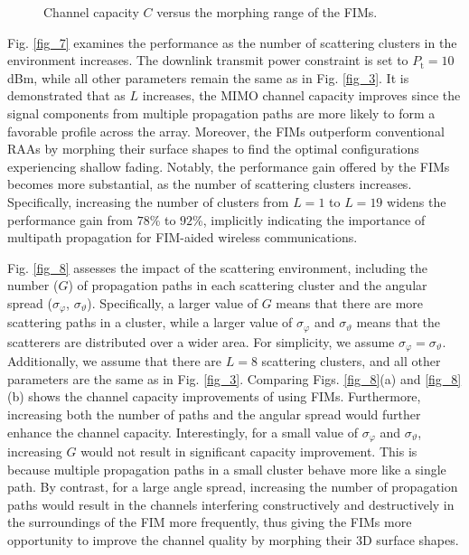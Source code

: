 \documentclass[lettersize,journal]{IEEEtran}
\begin{document}
\begin{figure}[!t]
\centering
{}
\caption{Channel capacity $C$ versus the morphing range of the FIMs.}\vspace{-0.5cm}
\label{fig_9}
\end{figure}

Fig. \ref{fig_7} examines the performance as the number of scattering clusters in the environment increases. The downlink transmit power constraint is set to $P_\textrm{t} = 10$ dBm, while all other parameters remain the same as in Fig. \ref{fig_3}. It is demonstrated that as $L$ increases, the MIMO channel capacity improves since the signal components from multiple propagation paths are more likely to form a favorable profile across the array. Moreover, the FIMs outperform conventional RAAs by morphing their surface shapes to find the optimal configurations experiencing shallow fading. Notably, the performance gain offered by the FIMs becomes more substantial, as the number of scattering clusters increases. Specifically, increasing the number of clusters from $L = 1$ to $L = 19$ widens the performance gain from $78$\% to $92$\%, implicitly indicating the importance of multipath propagation for FIM-aided wireless communications.

Fig. \ref{fig_8} assesses the impact of the scattering environment, including the number ($G$) of propagation paths in each scattering cluster and the angular spread (${\sigma}_{\varphi}$, ${\sigma}_{\vartheta}$). Specifically, a larger value of $G$ means that there are more scattering paths in a cluster, while a larger value of ${\sigma}_{\varphi}$ and ${\sigma}_{\vartheta}$ means that the scatterers are distributed over a wider area. For simplicity, we assume ${\sigma}_{\varphi} = {\sigma}_{\vartheta}$. Additionally, we assume that there are $L = 8$ scattering clusters, and all other parameters are the same as in Fig. \ref{fig_3}. Comparing Figs. \ref{fig_8}(a) and \ref{fig_8}(b) shows the channel capacity improvements of using FIMs. Furthermore, increasing both the number of paths and the angular spread would further enhance the channel capacity. Interestingly, for a small value of ${\sigma}_{\varphi}$ and ${\sigma}_{\vartheta}$, increasing $G$ would not result in significant capacity improvement. This is because multiple propagation paths in a small cluster behave more like a single path. By contrast, for a large angle spread, increasing the number of propagation paths would result in the channels interfering constructively and destructively in the surroundings of the FIM more frequently, thus giving the FIMs more opportunity to improve the channel quality by morphing their 3D surface shapes.
\end{document}
